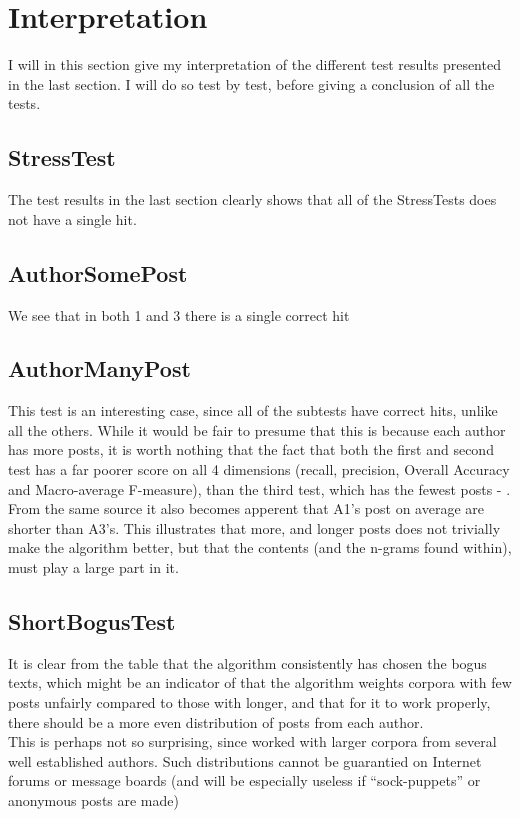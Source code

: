 \section{Interpretation}
\label{interpretation}
I will in this section give my interpretation of the different test results presented in the last section. I will do so test by test, before giving a conclusion of all the tests.

\subsection{StressTest}
The test results in the last section clearly shows that all of the StressTests does not have a single hit.

\subsection{AuthorSomePost}
We see that in both 1 and 3 there is a single correct hit

\subsection{AuthorManyPost}
This test is an interesting case, since all of the subtests have correct hits, unlike all the others. While it would be fair to presume that this is because each author has more posts, it is worth nothing that the fact that both the first and second test has a far poorer score on all 4 dimensions (recall, precision, Overall Accuracy and Macro-average F-measure), than the third test, which has the fewest posts - . From the same source it also becomes apperent that A1's post on average are shorter than A3's. This illustrates that more, and longer posts does not trivially make the algorithm better, but that the contents (and the n-grams found within), must play a large part in it.

\subsection{ShortBogusTest}
It is clear from the table that the algorithm consistently has chosen the bogus texts, which might be an indicator of that the algorithm weights corpora with few posts unfairly compared to those with longer, and that for it to work properly, there should be a more even distribution of posts from each author.\\

This is perhaps not so surprising, since \cite{nr4} worked with larger corpora from several well established authors. Such distributions cannot be guarantied on Internet forums or message boards (and will be especially useless if ``sock-puppets'' or anonymous posts are made) 

